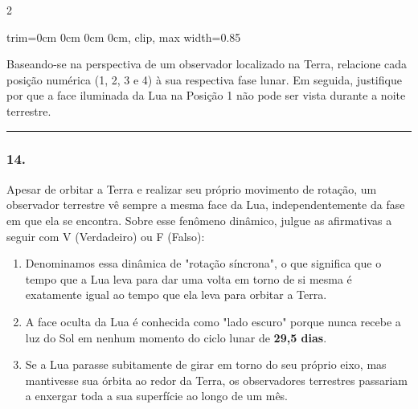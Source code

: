 \documentclass[twoside, 10pt, a4paper]{article}
\newlength{\espacoPreQuestao}
\newlength{\espacoQuestao}
\newlength{\espacoAlt}
\newcommand{\larguraTikz}{0.85\linewidth} %
\begin{document}
\begin{multicols*}{2}
\begin{center}
\begin{adjustbox}{trim=0cm 0cm 0cm 0cm, clip, max width=\larguraTikz}
\end{adjustbox}
\end{center}

Baseando-se na perspectiva de um observador localizado na Terra, relacione cada posição numérica (1, 2, 3 e 4) à sua respectiva fase lunar. Em seguida, justifique por que a face iluminada da Lua na Posição 1 não pode ser vista durante a noite terrestre.
\par\vspace{\espacoQuestao}

\noindent\textcolor{CorLinha}{\rule{\linewidth}{0.5pt}} 
\par\vspace{\espacoPreQuestao}
\subsubsection*{14.} Apesar de orbitar a Terra e realizar seu próprio movimento de rotação, um observador terrestre vê sempre a mesma face da Lua, independentemente da fase em que ela se encontra. Sobre esse fenômeno dinâmico, julgue as afirmativas a seguir com V (Verdadeiro) ou F (Falso):
\begin{enumerate}[label=\Roman*., itemsep=\espacoAlt]
    \item Denominamos essa dinâmica de "rotação síncrona", o que significa que o tempo que a Lua leva para dar uma volta em torno de si mesma é exatamente igual ao tempo que ela leva para orbitar a Terra.
    \item A face oculta da Lua é conhecida como "lado escuro" porque nunca recebe a luz do Sol em nenhum momento do ciclo lunar de \textbf{29,5 dias}.
    \item Se a Lua parasse subitamente de girar em torno do seu próprio eixo, mas mantivesse sua órbita ao redor da Terra, os observadores terrestres passariam a enxergar toda a sua superfície ao longo de um mês.
\end{enumerate}
\par\vspace{\espacoQuestao}


\end{multicols*}
\end{document}
